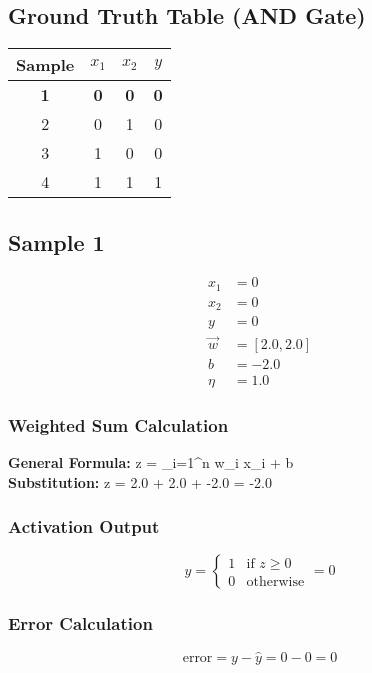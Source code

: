 \documentclass{article}
\begin{document}
\subsection*{Ground Truth Table (AND Gate)}
\begin{center}
\begin{tabular}{|c|c|c|c|}
\hline
\textbf{Sample} & $x_1$ & $x_2$ & $y$ \\
\hline
\rowcolor{yellow} \textbf{1} & \textbf{0} & \textbf{0} & \textbf{0} \\
\hline
2 & 0 & 1 & 0 \\
\hline
3 & 1 & 0 & 0 \\
\hline
4 & 1 & 1 & 1 \\
\hline
\end{tabular}
\end{center}

\subsection*{Sample 1}
\begin{align*}
x_1 &= 0 \\
x_2 &= 0 \\
y &= 0 \\
\vec{w} &= [2.0, 2.0] \\
b &= -2.0 \\
\eta &= 1.0
\end{align*}

\subsubsection*{Weighted Sum Calculation}
\textbf{General Formula:} \quad
z = \sum_{i=1}^{n} w_i x_i + b
\\
\textbf{Substitution:} \quad
z = 2.0  + 2.0  + -2.0 = -2.0

\subsubsection*{Activation Output}
\[
\hat{y} =
\begin{cases}
1 & \text{if } z \geq 0 \\
0 & \text{otherwise}
\end{cases}
= 0
\]

\subsubsection*{Error Calculation}
\[
\text{error} = y - \hat{y} = 0 - 0 = 0
\]
\end{document}
